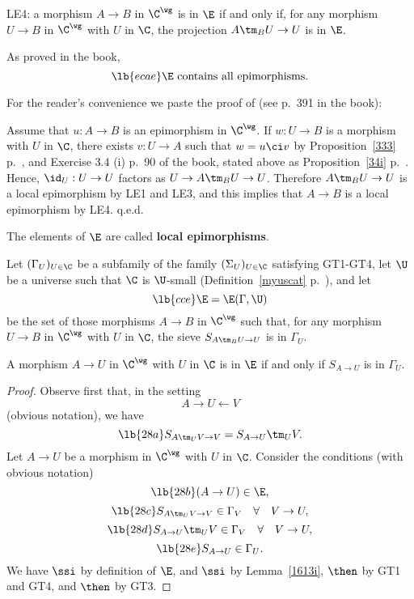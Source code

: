 \documentclass[12pt]{article}
\theoremstyle{remark}
\theoremstyle{definition}
\begin{document}
\nn LE4: a morphism $A\to B$ in $\C^\wg$ is in $\E$ if and only if, for any morphism $U\to B$ in $\C^\wg$ with $U$ in $\C$, the projection $A\tm_BU\to U$ is in $\E$.

As proved in the book, 
\begin{equation}\lb{ecae}
\E\text{ contains all epimorphisms.}
\end{equation}

For the reader's convenience we paste the proof of  (see p.~391 in the book):

Assume that $u:A\to B$ is an epimorphism in $\C^\wg$. If $w:U\to B$ is a morphism with $U$ in $\C$, there exists $v:U\to A$ such that $w=u\ci v$ by %
Proposition~\ref{333} p.~, and Exercise 3.4 (i) p.~90 of the book, stated above as Proposition~\ref{34i} p.~. Hence, $\id_U:U\to U$ factors as $U\to A\tm_BU\to U$. Therefore $A\tm_BU\to U$ is a local epimorphism by LE1 and LE3, and this implies that $A\to B$ is a local epimorphism by LE4. q.e.d.

The elements of $\E$ are called \textbf{local epimorphisms}.

Let $(\Gamma_U)_{U\in\C}$ be a subfamily of the family $(\Sigma_U)_{U\in\C}$ satisfying GT1\--GT4, let $\U$ be a universe such that $\C$ is $\U$-small (Definition~\ref{myuscat} p.~), and let 
\begin{equation}\lb{cce}
\E=\E(\Gamma,\U)
\end{equation} 
be the set of those morphisms $A\to B$ in $\C^\wg$ such that, for any morphism $U\to B$ in $\C^\wg$ with $U$ in $\C$, the sieve $S_{A\tm_BU\to U}$ is in $\Gamma_U$. 

\begin{lem}
A morphism $A\to U$ in $\C^\wg$ with $U$ in $\C$ is in $\E$ if and only if $S_{A\to U}$ is in $\Gamma_U$. 
\end{lem}

\begin{proof}
Observe first that, in the setting 
$$
A\to U\leftarrow V
$$ 
(obvious notation), we have 
\begin{equation}\lb{28a}
S_{A\tm_UV\to V}=S_{A\to U}\tm_UV.
\end{equation} 
Let $A\to U$ be a morphism in $\C^\wg$ with $U$ in $\C$. Consider the conditions (with obvious notation) 
\begin{equation}\lb{28b}
(A\to U)\in\E,
\end{equation}
\begin{equation}\lb{28c}
S_{A\tm_UV\to V}\in\Gamma_V\quad\forall\quad V\to U,
\end{equation}
\begin{equation}\lb{28d}
S_{A\to U}\tm_UV\in\Gamma_V\quad\forall\quad V\to U,
\end{equation}
\begin{equation}\lb{28e}
S_{A\to U}\in\Gamma_U.
\end{equation} 
We have  $\ssi$  by definition of $\E$, and  $\ssi$  by Lemma~\ref{1613i},  $\then$  by GT1 and GT4, and  $\then$  by GT3.
\end{proof}
\end{document}
